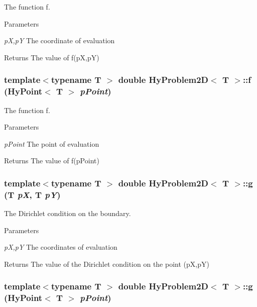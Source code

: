 The function f. 


\begin{DoxyParams}{Parameters}
\item[{\em pX,pY}]The coordinate of evaluation \end{DoxyParams}
\begin{DoxyReturn}{Returns}
The value of f(pX,pY) 
\end{DoxyReturn}
\hypertarget{classHyProblem2D_a01c5fa60862c89ded1a64f019f24b866}{
\subsubsection[{f}]{\setlength{\rightskip}{0pt plus 5cm}template$<$typename T $>$ double {\bf HyProblem2D}$<$ T $>$::f ({\bf HyPoint}$<$ T $>$ {\em pPoint})}}
\label{classHyProblem2D_a01c5fa60862c89ded1a64f019f24b866}


The function f. 


\begin{DoxyParams}{Parameters}
\item[{\em pPoint}]The point of evaluation \end{DoxyParams}
\begin{DoxyReturn}{Returns}
The value of f(pPoint) 
\end{DoxyReturn}
\hypertarget{classHyProblem2D_acf8413f6d284ffaab2194a3dd43e56b8}{
\subsubsection[{g}]{\setlength{\rightskip}{0pt plus 5cm}template$<$typename T $>$ double {\bf HyProblem2D}$<$ T $>$::g (T {\em pX}, \/  T {\em pY})}}
\label{classHyProblem2D_acf8413f6d284ffaab2194a3dd43e56b8}


The Dirichlet condition on the boundary. 


\begin{DoxyParams}{Parameters}
\item[{\em pX,pY}]The coordinates of evaluation \end{DoxyParams}
\begin{DoxyReturn}{Returns}
The value of the Dirichlet condition on the point (pX,pY) 
\end{DoxyReturn}
\hypertarget{classHyProblem2D_a3b2b6264520c3f1ee7e475ea3785d26d}{
\subsubsection[{g}]{\setlength{\rightskip}{0pt plus 5cm}template$<$typename T $>$ double {\bf HyProblem2D}$<$ T $>$::g ({\bf HyPoint}$<$ T $>$ {\em pPoint})}}
\label{classHyProblem2D_a3b2b6264520c3f1ee7e475ea3785d26d}


